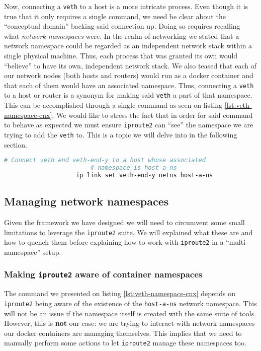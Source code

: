                 Now, connecting a \texttt{veth} to a host is a more intricate process. Even though it is true that it only requires a single command, we need be clear about the ``conceptual domain'' backing said connection up. Doing so requires recalling what \textit{network namespaces} were. In the realm of networking we stated that a network namespace could be regarded as an independent network stack within a single physical machine. Thus, each process that was granted its own would ``believe'' to have its own, independent network stack. We also teased that each of our network nodes (both hosts and routers) would run as a docker container and that each of them would have an associated namespace. Thus, connecting a \texttt{veth} to a host or router is a synonym for making said \texttt{veth} a part of that namespace. This can be accomplished through a single command as seen on listing \ref{lst:veth-namespace-cnx}. We would like to stress the fact that in order for said command to behave as expected we must ensure \texttt{iproute2} can ``see'' the namespace we are trying to add the \texttt{veth} to. This is a topic we will delve into in the following section.\\

                \begin{lstlisting}[language = bash, caption = Connecting a \texttt{veth} end to a host or router., label = lst:veth-namespace-cnx]
                    # Connect veth end veth-end-y to a host whose associated
                        # namespace is host-a-ns
                    ip link set veth-end-y netns host-a-ns
                \end{lstlisting}

        \subsection{Managing network namespaces}
            Given the framework we have designed we will need to circumvent some small limitations to leverage the \texttt{iproute2} suite. We will explained what these are and how to quench them before explaining how to work with \texttt{iproute2} in a ``multi-namespace'' setup.\\

            \subsubsection{Making \texttt{iproute2} aware of container namespaces}
                The command we presented on listing \ref{lst:veth-namespace-cnx} depends on \texttt{iproute2} being aware of the existence of the \texttt{host-a-ns} network namespace. This will not be an issue if the namespace itself is created with the same suite of tools. However, this is \textbf{not} our case: we are trying to interact with network namespaces our docker containers are managing themselves. This implies that we need to manually perform some actions to let \texttt{iproute2} manage these namespaces too.\\

